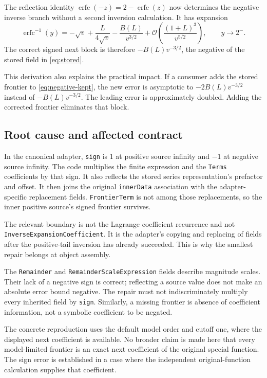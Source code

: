 \documentclass[11pt,a4paper]{article}
\newcommand{\code}[1]{\nolinkurl{#1}}
\newcommand{\OO}{\mathcal O}
\newcommand{\erfc}{\operatorname{erfc}}
\begin{document}
The reflection identity $\erfc(-z)=2-\erfc(z)$ now determines the negative
inverse branch without a second inversion calculation.\cite{erfcsymmetry}
It has expansion
\begin{equation}
 \erfc^{-1}(y)
 =-\sqrt v+\frac{L}{4\sqrt v}
  -\frac{B(L)}{v^{3/2}}
  +\OO\!\left(\frac{(1+L)^3}{v^{5/2}}\right),
 \qquad y\to2^-.
 \label{eq:correct-negative}
\end{equation}
The correct signed next block is therefore $-B(L)v^{-3/2}$, the negative of
the stored field in \eqref{eq:stored}.

This derivation also explains the practical impact. If a consumer adds the
stored frontier to \eqref{eq:negative-kept}, the new error is asymptotic to
$-2B(L)v^{-3/2}$ instead of $-B(L)v^{-3/2}$. The leading error is approximately
doubled. Adding the corrected frontier eliminates that block.

\subsection{Root cause and affected contract}

In the canonical adapter, \code{sign} is $1$ at positive source infinity and
$-1$ at negative source infinity. The code multiplies the finite expression
and the \code{Terms} coefficients by that sign. It also reflects the stored
series representation's prefactor and offset. It then joins the original
\code{innerData} association with the adapter-specific replacement fields.
\code{FrontierTerm} is not among those replacements, so the inner positive
source's signed frontier survives.\cite{adapters}

The relevant boundary is not the Lagrange coefficient recurrence and not
\code{InverseExpansionCoefficient}. It is the adapter's copying and replacing
of fields after the positive-tail inversion has already succeeded. This is
why the smallest repair belongs at object assembly.

The \code{Remainder} and \code{RemainderScaleExpression} fields describe
magnitude scales. Their lack of a negative sign is correct; reflecting a
source value does not make an absolute error bound negative. The repair must
not indiscriminately multiply every inherited field by \code{sign}.
Similarly, a missing frontier is absence of coefficient information, not a
symbolic coefficient to be negated.

The concrete reproduction uses the default model order and cutoff one, where
the displayed next coefficient is available. No broader claim is made here
that every model-limited frontier is an exact next coefficient of the original
special function. The sign error is established in a case where the
independent original-function calculation supplies that coefficient.
\end{document}
